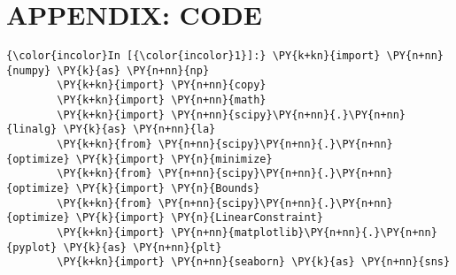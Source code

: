  \section{APPENDIX: CODE}

    \begin{Verbatim}[commandchars=\\\{\}]
{\color{incolor}In [{\color{incolor}1}]:} \PY{k+kn}{import} \PY{n+nn}{numpy} \PY{k}{as} \PY{n+nn}{np}
        \PY{k+kn}{import} \PY{n+nn}{copy}
        \PY{k+kn}{import} \PY{n+nn}{math}
        \PY{k+kn}{import} \PY{n+nn}{scipy}\PY{n+nn}{.}\PY{n+nn}{linalg} \PY{k}{as} \PY{n+nn}{la}
        \PY{k+kn}{from} \PY{n+nn}{scipy}\PY{n+nn}{.}\PY{n+nn}{optimize} \PY{k}{import} \PY{n}{minimize}
        \PY{k+kn}{from} \PY{n+nn}{scipy}\PY{n+nn}{.}\PY{n+nn}{optimize} \PY{k}{import} \PY{n}{Bounds}
        \PY{k+kn}{from} \PY{n+nn}{scipy}\PY{n+nn}{.}\PY{n+nn}{optimize} \PY{k}{import} \PY{n}{LinearConstraint}
        \PY{k+kn}{import} \PY{n+nn}{matplotlib}\PY{n+nn}{.}\PY{n+nn}{pyplot} \PY{k}{as} \PY{n+nn}{plt}
        \PY{k+kn}{import} \PY{n+nn}{seaborn} \PY{k}{as} \PY{n+nn}{sns}
\end{Verbatim}


